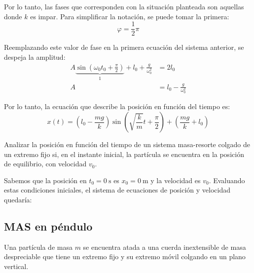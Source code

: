 \begin{mdframed}[style=ExampleFrame]
    Por lo tanto, las fases que corresponden con la situación planteada son aquellas donde $k$ es impar.
    Para simplificar la notación, se puede tomar la primera:
    \[ \varphi = \frac{1}{2} \pi \]
    
    Reemplazando este valor de fase en la primera ecuación del sistema anterior, se despeja la amplitud:
    \begin{align*}
        A \underbrace{\sin{(\omega_0 t_0 + \tfrac{\pi}{2} )}}_{1} + l_0 + \frac{g}{\omega_0^2} &= 2l_0
        \\
        A &= l_0-\frac{g}{\omega_0^2}
    \end{align*}
    
    Por lo tanto, la ecuación que describe la posición en función del tiempo es:
    \[
      x(t) = \left( l_0-\frac{mg}{k}\right)  \sin{ \left(\sqrt{\frac{k}{m}} t + \frac{\pi}{2} \right)} + \left( \frac{mg}{k} + l_0 \right)
    \]
\end{mdframed}

\begin{mdframed}[style=ExampleFrame]
    \begin{example}
    \end{example}
    \begin{formatI}
        Analizar la posición en función del tiempo de un sistema masa-resorte colgado de un extremo fijo si, en el instante inicial, la partícula se encuentra en la posición de equilibrio, con velocidad $v_0$.
    \end{formatI}
    Sabemos que la posición en $t_0 = \SI{0}{\second}$ es $x_0 = \SI{0}{\metre}$ y la velocidad es $v_0$.
    Evaluando estas condiciones iniciales, el sistema de ecuaciones de posición y velocidad quedaría:
    
\end{mdframed}


\subsection{MAS en péndulo}

Una partícula de masa $m$ se encuentra atada a una cuerda inextensible de masa despreciable que tiene un extremo fijo y su extremo móvil colgando en un plano vertical.

